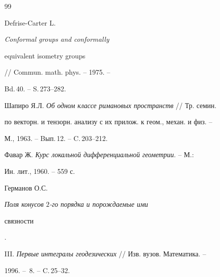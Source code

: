 \begin{thebibliography}{99}
 




Defrise-Carter L. {\em Conformal groups and conformally 


equivalent isometry groups} // Commun. math. phys. -- 1975. -- 


Bd.\,40. -- S.\,273--282. 


 




Шапиро Я.Л. {\em Об одном классе римановых пространств} // Тр. семин. 


по векторн. и тензорн. анализу с их прилож. к геом., механ. и физ. --


М., 1963. -- Bып.\,12. -- C.\,203--212. 


 




Фавар Ж. {\em Курс локальной дифференциальной геометрии}. -- М.: 


Ин. лит., 1960. -- 559 с. 


 




Германов О.С. {\em Поля конусов $2$-го порядка и порождаемые ими 


связности}. 


III. {\em Первые интегралы геодезических} // Изв. вузов. Математика. -- 


1996. -- \No\,8. -- C.\,25--32. 


 


\end{thebibliography} 


 


\vskip 2cm 


 








\label{end} 


 


 


